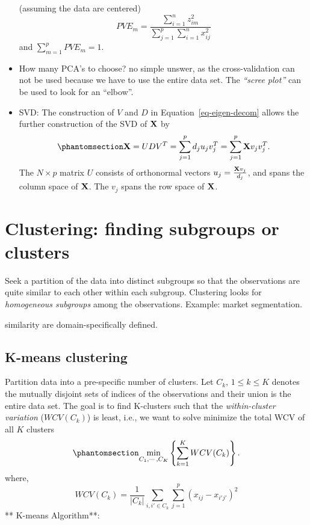 \documentclass[
  letterpaper,
  DIV=11,
  numbers=noendperiod]{scrreprt}
\begin{document}
\begin{itemize}
  (assuming the data are centered) \[
  PVE_m=\frac{\sum_{i=1}^n z_{im}^2}{\sum_{j=1}^p\sum_{i=1}^n x_{ij}^2}
  \] and \(\sum_{m=1}^p PVE_m = 1\).
\item
  How many PCA's to choose? no simple unswer, as the cross-validation
  can not be used because we have to use the entire data set. The
  \emph{``scree plot''} can be used to look for an ``elbow''.
\item
  SVD: The construction of \(V\) and \(D\) in
  Equation~\ref{eq-eigen-decom} allows the further construction of the
  SVD of \({\bf X}\) by
  \begin{equation}\phantomsection\label{eq-svd}{{\bf X}=UDV^T =\sum_{j=1}^p d_ju_jv_j^T = \sum_{j=1}^p {\bf X}v_jv_j^T. }\end{equation}
  The \(N\times p\) matrix \(U\) consists of orthonormal vectors
  \(u_j=\frac{{\bf X}v_j}{d_j}\), and spans the column space of
  \({\bf X}\). The \(v_j\) spans the row space of \({\bf X}\).
\end{itemize}

\section{Clustering: finding subgroups or
clusters}\label{clustering-finding-subgroups-or-clusters}

Seek a partition of the data into distinct subgroups so that the
observations are quite similar to each other within each subgroup.
Clustering looks for \emph{homogeneous subgroups} among the
observations. Example: market segmentation.

similarity are domain-specifically defined.

\subsection{K-means clustering}\label{k-means-clustering}

Partition data into a pre-specific number of clusters. Let \(C_k\),
\(1\le k \le K\) denotes the mutually disjoint sets of indices of the
observations and their union is the entire data set. The goal is to find
K-clusters such that the \emph{within-cluster variation} (\(WCV(C_k)\))
is least, i.e., we want to solve minimize the total WCV of all \(K\)
clusters \begin{equation}\phantomsection\label{eq-clustering-var}{
\min_{C_1, \cdots, C_K} \left\{ \sum_{k=1}^K WCV(C_k) \right\}.
}\end{equation} where, \[
WCV(C_k)=\frac{1}{|C_k|}\sum_{i,i'\in C_k}\sum_{j=1}^p(x_{ij}-x_{i'j'})^2
\] ** K-means Algorithm**:
\end{document}
